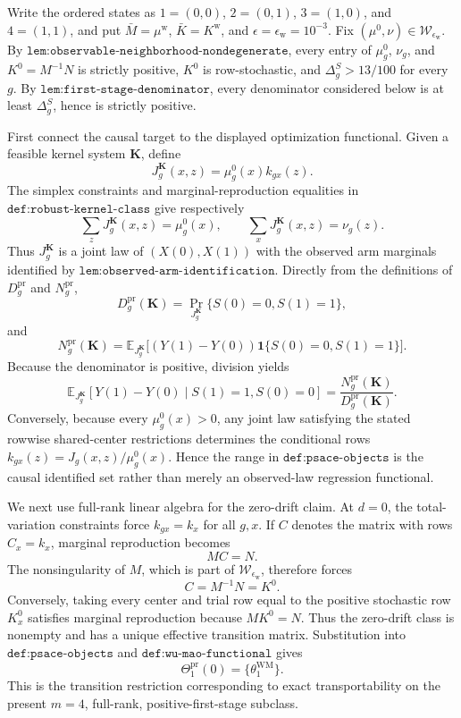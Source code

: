Write the ordered states as \(1=(0,0)\), \(2=(0,1)\), \(3=(1,0)\), and \(4=(1,1)\), and put \(\bar M=\mu^{\mathrm w}\), \(\bar K=K^{\mathrm w}\), and \(\epsilon=\epsilon_{\mathrm w}=10^{-3}\). Fix \((\mu^0,\nu)\in\mathcal W_{\epsilon_{\mathrm w}}\). By \(\texttt{lem:observable-neighborhood-nondegenerate}\), every entry of \(\mu_g^0\), \(\nu_g\), and \(K^0=M^{-1}N\) is strictly positive, \(K^0\) is row-stochastic, and \(\Delta_g^S>13/100\) for every \(g\). By \(\texttt{lem:first-stage-denominator}\), every denominator considered below is at least \(\Delta_g^S\), hence is strictly positive.

First connect the causal target to the displayed optimization functional. Given a feasible kernel system \(\mathbf K\), define
\[
 J_g^{\mathbf K}(x,z)=\mu_g^0(x)k_{gx}(z).
\]
The simplex constraints and marginal-reproduction equalities in \(\texttt{def:robust-kernel-class}\) give respectively
\[
 \sum_zJ_g^{\mathbf K}(x,z)=\mu_g^0(x),
 \qquad
 \sum_xJ_g^{\mathbf K}(x,z)=\nu_g(z).
\]
Thus \(J_g^{\mathbf K}\) is a joint law of \((X(0),X(1))\) with the observed arm marginals identified by \(\texttt{lem:observed-arm-identification}\). Directly from the definitions of \(D_g^{\mathrm{pr}}\) and \(N_g^{\mathrm{pr}}\),
\[
 D_g^{\mathrm{pr}}(\mathbf K)
 =\Pr_{J_g^{\mathbf K}}\{S(0)=0,S(1)=1\},
\]
and
\[
 N_g^{\mathrm{pr}}(\mathbf K)
 =\mathbb E_{J_g^{\mathbf K}}
 \bigl[(Y(1)-Y(0))\mathbf 1\{S(0)=0,S(1)=1\}\bigr].
\]
Because the denominator is positive, division yields
\[
 \mathbb E_{J_g^{\mathbf K}}
 [Y(1)-Y(0)\mid S(1)=1,S(0)=0]
 =\frac{N_g^{\mathrm{pr}}(\mathbf K)}{D_g^{\mathrm{pr}}(\mathbf K)}.
\]
Conversely, because every \(\mu_g^0(x)>0\), any joint law satisfying the stated rowwise shared-center restrictions determines the conditional rows \(k_{gx}(z)=J_g(x,z)/\mu_g^0(x)\). Hence the range in \(\texttt{def:psace-objects}\) is the causal identified set rather than merely an observed-law regression functional.

We next use full-rank linear algebra for the zero-drift claim. At \(d=0\), the total-variation constraints force \(k_{gx}=k_x\) for all \(g,x\). If \(C\) denotes the matrix with rows \(C_x=k_x\), marginal reproduction becomes
\[
 MC=N.
\]
The nonsingularity of \(M\), which is part of \(\mathcal W_{\epsilon_{\mathrm w}}\), therefore forces
\[
 C=M^{-1}N=K^0.
\]
Conversely, taking every center and trial row equal to the positive stochastic row \(K_x^0\) satisfies marginal reproduction because \(MK^0=N\). Thus the zero-drift class is nonempty and has a unique effective transition matrix. Substitution into \(\texttt{def:psace-objects}\) and \(\texttt{def:wu-mao-functional}\) gives
\[
 \Theta_1^{\mathrm{pr}}(0)=\{\theta_1^{\mathrm{WM}}\}.
\]
This is the transition restriction corresponding to exact transportability on the present \(m=4\), full-rank, positive-first-stage subclass.

